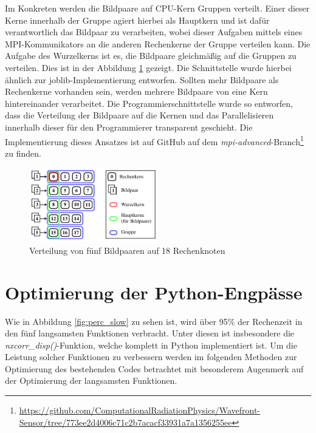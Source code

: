 Im Konkreten werden die Bildpaare auf \gls{CPU}-Kern Gruppen verteilt. Einer dieser Kerne innerhalb der Gruppe agiert hierbei als Hauptkern und ist dafür verantwortlich das Bildpaar zu verarbeiten, wobei dieser Aufgaben mittels eines \gls{MPI}-Kommunikators an die anderen Rechenkerne der Gruppe verteilen kann. Die Aufgabe des Wurzelkerns ist es, die Bildpaare gleichmäßig auf die Gruppen zu verteilen. Dies ist in der Abbildung \ref{fig:parallel_concept} gezeigt. Die Schnittstelle wurde hierbei ähnlich zur joblib-Implementierung entworfen. Sollten mehr Bildpaare als Rechenkerne vorhanden sein, werden mehrere Bildpaare von eine Kern hintereinander verarbeitet. Die Programmierschnittstelle wurde so entworfen, dass die Verteilung der Bildpaare auf die Kernen und das Parallelisieren innerhalb dieser für den Programmierer transparent geschieht. Die Implementierung dieses Ansatzes ist auf GitHub auf dem \textit{mpi-advanced}-Branch\footnote{\url{https://github.com/ComputationalRadiationPhysics/Wavefront-Sensor/tree/773ee2d4006c71c2b7acacf33931a7a1356255ee}} zu finden.

\begin{center}
	\begin{figure}[htbp]
		\centering
		\includegraphics[width=0.5\textwidth]{pdf/parallel}
		\caption[Verteilung]{Verteilung von fünf Bildpaaren auf 18 Rechenknoten}
		\label{fig:parallel_concept}
	\end{figure}
\end{center}

\section{Optimierung der Python-Engpässe}

Wie in Abbildung \ref{fig:perc_slow} zu sehen ist, wird über 95\% der Rechenzeit in den fünf langsamsten Funktionen verbracht. Unter diesen ist insbesondere die \textit{nxcorr\_disp()}-Funktion, welche komplett in Python implementiert ist. Um die Leistung solcher Funktionen zu verbessern werden im folgenden Methoden zur Optimierung des bestehenden Codes betrachtet mit besonderem Augenmerk auf der Optimierung der langsamsten Funktionen. 

